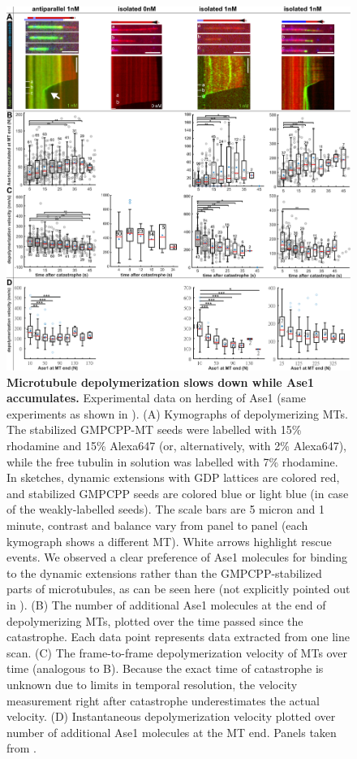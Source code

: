 \begin{figure}[h!]
    \centering
    \includegraphics[width=1\linewidth]{Figures/ase2b.png}
    \caption[Microtubule depolymerization slows down while Ase1 accumulates.]{\textbf{Microtubule depolymerization slows down while Ase1 accumulates.} Experimental data on herding of Ase1 (same experiments as shown in ). (A) Kymographs of depolymerizing MTs. The stabilized GMPCPP-MT seeds were labelled with 15\% rhodamine and 15\% Alexa647 (or, alternatively, with 2\% Alexa647), while the free tubulin in solution was labelled with 7\% rhodamine. In sketches, dynamic extensions with GDP lattices are colored red, and stabilized GMPCPP seeds are colored blue or light blue (in case of the weakly-labelled seeds). The scale bars are 5 micron and 1 minute, contrast and balance vary from panel to panel (each kymograph shows a different MT). White arrows highlight rescue events. We observed a clear preference of Ase1 molecules for binding to the dynamic extensions rather than the GMPCPP-stabilized parts of microtubules, as can be seen here (not explicitly pointed out in \cite{Krattenmacher2024}). (B) The number of additional Ase1 molecules at the end of depolymerizing MTs, plotted over the time passed since the catastrophe. Each data point represents data extracted from one line scan. (C) The frame-to-frame depolymerization velocity of MTs over time (analogous to B). Because the exact time of catastrophe is unknown due to limits in temporal resolution, the velocity measurement right after catastrophe underestimates the actual velocity. (D) Instantaneous depolymerization velocity plotted over number of additional Ase1 molecules at the MT end. Panels taken from \cite{Krattenmacher2024}.
        }\label{ase2b}
\end{figure}


